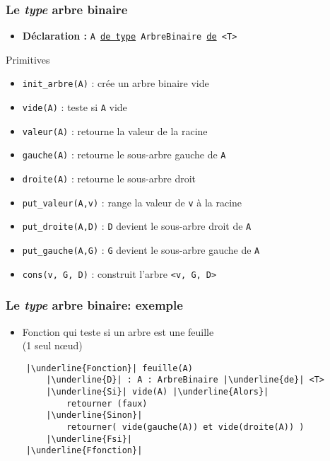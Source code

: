 \documentclass[table,handout,tikz,12pt,svgnames]{beamer}
\begin{document}
\begin{frame}[fragile=singleslide]
	\frametitle{Le \textit{type} arbre binaire}
	\vspace{-1em}
	\begin{block}{} %
		\begin{itemize}
			\item \textbf{Déclaration :} \texttt{A \underline{de type} ArbreBinaire \underline{de} <T>}
		\end{itemize}
	\end{block}
	\begin{block}{Primitives}
		\begin{itemize}%
			\item \texttt{init\_arbre(A)} : crée un arbre binaire vide
			\item \texttt{vide(A)} : teste si \texttt{A} vide
			\item \texttt{valeur(A)} : retourne la valeur de la racine
			\item \texttt{gauche(A)} : retourne le sous-arbre gauche de \texttt{A}
			\item \texttt{droite(A)} : retourne le sous-arbre droit
			\item \texttt{put\_valeur(A,v)} : range la valeur de \texttt{v} à la racine
			\item \texttt{put\_droite(A,D)} : \texttt{D} devient le sous-­arbre droit de \texttt{A}
			\item \texttt{put\_gauche(A,G)} : \texttt{G} devient le sous-arbre gauche de \texttt{A}
			\item \texttt{cons(v, G, D)} : construit l'arbre \texttt{<v, G, D>}
		\end{itemize}
	\end{block}
\end{frame}


\begin{frame}[fragile=singleslide]
	\frametitle{Le \textit{type} arbre binaire: exemple}
	\begin{block}{} %
		\begin{itemize}
			\item Fonction qui teste si un arbre est une feuille\\(1 seul nœud)
		\end{itemize}
	\end{block}
	\begin{block}{}
		\begin{verbatim}
	|\underline{Fonction}| feuille(A)
		|\underline{D}| : A : ArbreBinaire |\underline{de}| <T>
		|\underline{Si}| vide(A) |\underline{Alors}|
			retourner (faux)
		|\underline{Sinon}|
			retourner( vide(gauche(A)) et vide(droite(A)) )
		|\underline{Fsi}|
	|\underline{Ffonction}|
		\end{verbatim}
	\end{block}
\end{frame}
\end{document}
